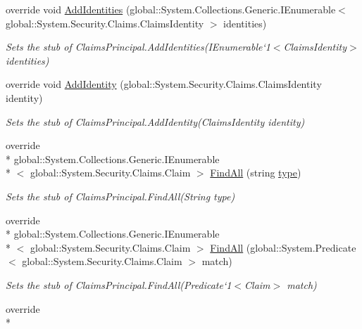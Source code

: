 \begin{DoxyCompactItemize}
override void \hyperlink{class_system_1_1_security_1_1_claims_1_1_fakes_1_1_stub_claims_principal_a633d760711940944914f190b19e568b0}{Add\-Identities} (global\-::\-System.\-Collections.\-Generic.\-I\-Enumerable$<$ global\-::\-System.\-Security.\-Claims.\-Claims\-Identity $>$ identities)
\begin{DoxyCompactList}\small\item\em Sets the stub of Claims\-Principal.\-Add\-Identities(I\-Enumerable`1$<$Claims\-Identity$>$ identities)\end{DoxyCompactList}\item 
override void \hyperlink{class_system_1_1_security_1_1_claims_1_1_fakes_1_1_stub_claims_principal_a118395107c56ed4c3a6a2e8eaf2b6d81}{Add\-Identity} (global\-::\-System.\-Security.\-Claims.\-Claims\-Identity identity)
\begin{DoxyCompactList}\small\item\em Sets the stub of Claims\-Principal.\-Add\-Identity(\-Claims\-Identity identity)\end{DoxyCompactList}\item 
override \\*
global\-::\-System.\-Collections.\-Generic.\-I\-Enumerable\\*
$<$ global\-::\-System.\-Security.\-Claims.\-Claim $>$ \hyperlink{class_system_1_1_security_1_1_claims_1_1_fakes_1_1_stub_claims_principal_a044d7589550b4374e0a477c9c00cb421}{Find\-All} (string \hyperlink{jquery-1_810_82-vsdoc_8js_a3940565e83a9bfd10d95ffd27536da91}{type})
\begin{DoxyCompactList}\small\item\em Sets the stub of Claims\-Principal.\-Find\-All(\-String type)\end{DoxyCompactList}\item 
override \\*
global\-::\-System.\-Collections.\-Generic.\-I\-Enumerable\\*
$<$ global\-::\-System.\-Security.\-Claims.\-Claim $>$ \hyperlink{class_system_1_1_security_1_1_claims_1_1_fakes_1_1_stub_claims_principal_a914796b095b97c68c5aa2eee7e935040}{Find\-All} (global\-::\-System.\-Predicate$<$ global\-::\-System.\-Security.\-Claims.\-Claim $>$ match)
\begin{DoxyCompactList}\small\item\em Sets the stub of Claims\-Principal.\-Find\-All(Predicate`1$<$Claim$>$ match)\end{DoxyCompactList}\item 
override \\*

\end{DoxyCompactItemize}

